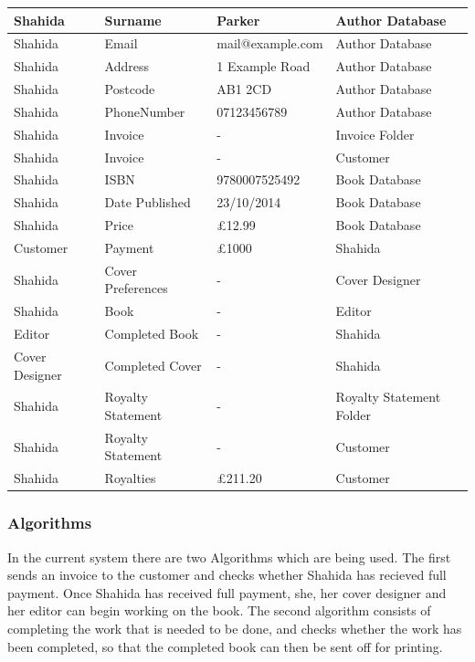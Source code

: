 \begin{center}
\begin{tabular}{|p{3.5cm}|p{3.5cm}|p{3cm}|p{3cm}|}
    Shahida & Surname & Parker & Author Database  \\ \hline
    Shahida & Email & mail@example.com & Author Database  \\ \hline
    Shahida & Address & 1 Example Road & Author Database  \\ \hline
    Shahida & Postcode & AB1 2CD & Author Database  \\ \hline
    Shahida & PhoneNumber & 07123456789 & Author Database  \\ \hline
    Shahida & Invoice & - & Invoice Folder \\ \hline
    Shahida & Invoice & - & Customer  \\ \hline
    Shahida & ISBN & 9780007525492 & Book Database \\ \hline
    Shahida & Date Published & 23/10/2014 & Book Database \\ \hline
    Shahida & Price & £12.99 & Book Database \\ \hline
    Customer & Payment & £1000 & Shahida  \\ \hline
    Shahida & Cover Preferences & - & Cover Designer\\ \hline
    Shahida & Book & - & Editor  \\ \hline
    Editor & Completed Book & - & Shahida  \\ \hline
    Cover Designer & Completed Cover & - & Shahida \\ \hline
    Shahida & Royalty Statement & - & Royalty Statement Folder \\ \hline
    Shahida & Royalty Statement & - & Customer \\ \hline
    Shahida & Royalties & £211.20 & Customer \\ \hline 
    \hline
\end{tabular}
\end{center}


\subsubsection{Algorithms}
In the current system there are two Algorithms which are being used. The first sends an invoice to the customer and checks whether Shahida has recieved full payment. Once Shahida has received full payment, she, her cover designer and her editor can begin working on the book. The second algorithm consists of completing the work that is needed to be done, and checks whether the work has been completed, so that the completed book can then be sent off for printing. 

